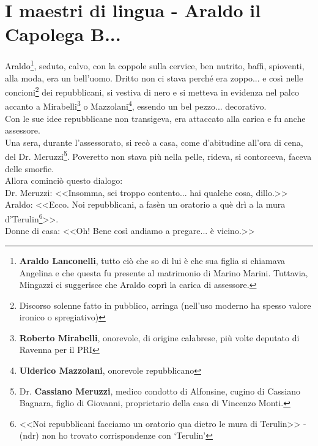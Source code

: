 %
\chapter{I maestri di lingua - Araldo il Capolega B...}
Araldo\footnote{\textbf{Araldo Lanconelli},  tutto ciò che so di lui è che sua figlia si chiamava Angelina e che questa fu presente al matrimonio di Marino Marini. Tuttavia, Mingazzi ci suggerisce che Araldo coprì la carica di assessore.}, seduto, calvo, con la coppole sulla cervice, ben nutrito, baffi, spioventi, alla moda, era un bell'uomo. Dritto non ci stava perché era zoppo... e così nelle concioni\footnote{Discorso solenne fatto in pubblico, arringa (nell’uso moderno ha spesso valore ironico o spregiativo)} dei repubblicani, si vestiva di nero e si metteva in evidenza nel palco accanto a Mirabelli\footnote{\textbf{Roberto Mirabelli}, onorevole, di origine calabrese, più volte deputato di Ravenna per il PRI} o Mazzolani\footnote{\textbf{Ulderico Mazzolani}, onorevole repubblicano}, essendo un bel pezzo... decorativo.\\
\indent Con le sue idee repubblicane non transigeva, era attaccato alla carica e fu anche assessore.\\
\indent Una sera, durante l'assessorato, si recò a casa, come d'abitudine all'ora di cena, del Dr. Meruzzi\footnote{Dr. \textbf{Cassiano Meruzzi}, medico condotto di Alfonsine, cugino di Cassiano Bagnara, figlio di Giovanni, proprietario della casa di Vincenzo Monti.}. Poveretto non stava più nella pelle, rideva, si contorceva, faceva delle smorfie.\\
\indent Allora cominciò questo dialogo:\\
\indent Dr. Meruzzi: <<Insomma, sei troppo contento... hai qualche cosa, dillo.>>\\
\indent {}Araldo: <<Ecco. Noi repubblicani, a fasèn un oratorio a què drì a la mura d'Terulin\footnote{<<Noi repubblicani facciamo un oratorio qua dietro le mura di Terulin>> - (ndr) non ho trovato corrispondenze con `Terulin'}>>.\\
\indent Donne di casa: <<Oh! Bene così andiamo a pregare... è vicino.>>\\
